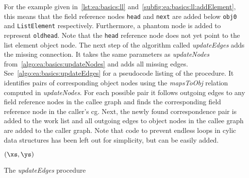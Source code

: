 			For the example given in~\cref{lst:ea:basics:ll} and~\cref{subfig:ea:basics:ll:addElement}, this means that the
			field reference nodes \texttt{head} and \texttt{next} are added below \texttt{obj0} and \texttt{ListElement}
			respectively. Furthermore, a phantom node is added to represent \texttt{oldhead}. Note that the \texttt{head}
			reference node does not yet point to the list element object node. The next step of the algorithm called
			\emph{updateEdges} adds the missing connection. It takes the same parameters as \emph{updateNodes}
			from~\cref{algo:ea:basics:updateNodes} and adds all missing edges. See~\cref{algo:ea:basics:updateEdges} for
			a pseudocode listing of the procedure. It identifies pairs of corresponding object nodes using the
			\emph{mapsToObj} relation computed in \emph{updateNodes}. For each possible pair it follows outgoing edges to any
			field reference nodes in the callee graph and finds the corresponding field reference node in the caller's
			\gls{cg}. Next, the newly found correspondence pair is added to the work list and all outgoing edges to object
			nodes in the callee graph are added to the caller graph. Note that code to prevent endless loops in cylic data
			structures has been left out for simplicity, but can be easily added.

			\begin{algorithm}

				\BlankLine
				\DontPrintSemicolon
				\updateEdges$\left( \xs, \ys \right)$\;
				\PrintSemicolon

				\caption[The \emph{updateEdges} procedure]{The \emph{updateEdges} procedure~\cite[Alg. 3]{lang:12}}
				\label{algo:ea:basics:updateEdges}
			\end{algorithm}

